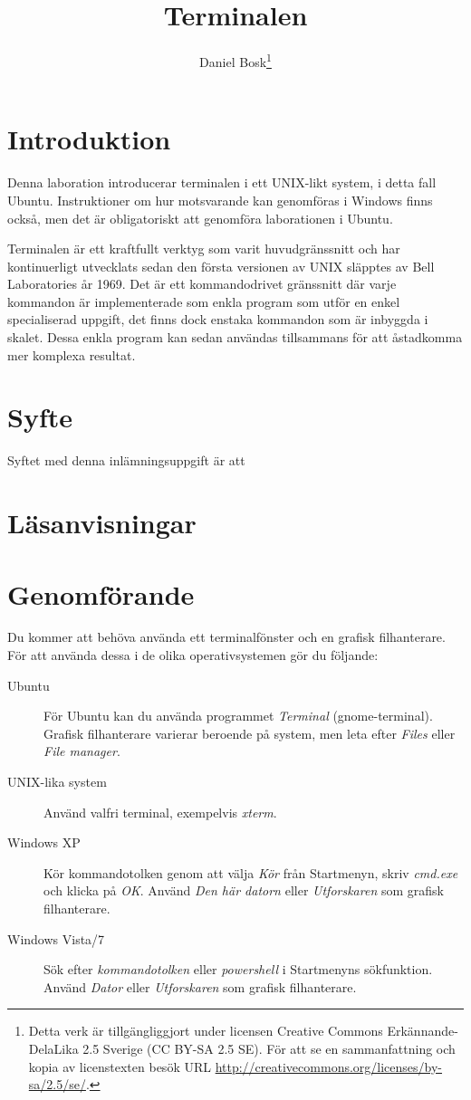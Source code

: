 \documentclass[a4paper]{miunasgn}
\title{Terminalen}
\author{Daniel Bosk\footnote{%
	Detta verk är tillgängliggjort under licensen Creative Commons 
	Erkännande-DelaLika 2.5 Sverige (CC BY-SA 2.5 SE).
	För att se en sammanfattning och kopia av licenstexten besök URL 
	\url{http://creativecommons.org/licenses/by-sa/2.5/se/}.
}}
\date{\svnId}
\begin{document}
\maketitle
\thispagestyle{foot}
\tableofcontents


\section{Introduktion}
\label{sec:Introduktion}
\noindent
Denna laboration introducerar terminalen i ett UNIX-likt system, i detta fall 
Ubuntu.
Instruktioner om hur motsvarande kan genomföras i Windows finns också, men det 
är obligatoriskt att genomföra laborationen i Ubuntu.

Terminalen är ett kraftfullt verktyg som varit huvudgränssnitt och har 
kontinuerligt utvecklats sedan den första versionen av UNIX släpptes av Bell 
Laboratories år 1969.
Det är ett kommandodrivet gränssnitt där varje kommandon är implementerade som 
enkla program som utför en enkel specialiserad uppgift, det finns dock enstaka 
kommandon som är inbyggda i skalet.
Dessa enkla program kan sedan användas tillsammans för att åstadkomma mer 
komplexa resultat.


\section{Syfte}
\label{sec:Syfte}
\noindent
Syftet med denna inlämningsuppgift är att
\begin{itemize}
	
\end{itemize}


\section{Läsanvisningar}
\label{sec:Lasanvisningar}
\noindent



\section{Genomförande}
\label{sec:Genomforande}
\noindent
Du kommer att behöva använda ett terminalfönster och en grafisk filhanterare.
För att använda dessa i de olika operativsystemen gör du följande:
\begin{description}
	\item[Ubuntu] För Ubuntu kan du använda programmet \emph{Terminal} 
		(gnome-terminal).
		Grafisk filhanterare varierar beroende på system, men leta efter 
		\emph{Files} eller \emph{File manager}.
	\item[UNIX-lika system] Använd valfri terminal, exempelvis \emph{xterm}.
	\item[Windows XP] Kör kommandotolken genom att välja \emph{Kör} från
		Startmenyn, skriv \emph{cmd.exe} och klicka på \emph{OK}.
		Använd \emph{Den här datorn} eller \emph{Utforskaren} som grafisk
		filhanterare.
	\item[Windows Vista/7] Sök efter \emph{kommandotolken} eller
		\emph{powershell} i Startmenyns sökfunktion.
		Använd \emph{Dator} eller \emph{Utforskaren} som grafisk filhanterare.
\end{description}
\end{document}

